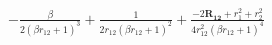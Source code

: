\documentclass[12pt,a3paper]{article}
\begin{document}
    \tiny{$
- \frac{\beta}{2 \left(\beta r_{12} + 1\right)^{3}} + \frac{1}{2 r_{12} \left(\beta r_{12} + 1\right)^{2}} + \frac{- 2 \mathbf{R_{12}} + r_{1}^{2} + r_{2}^{2}}{4 r_{12}^{2} \left(\beta r_{12} + 1\right)^{4}}$}
    
\end{document}
